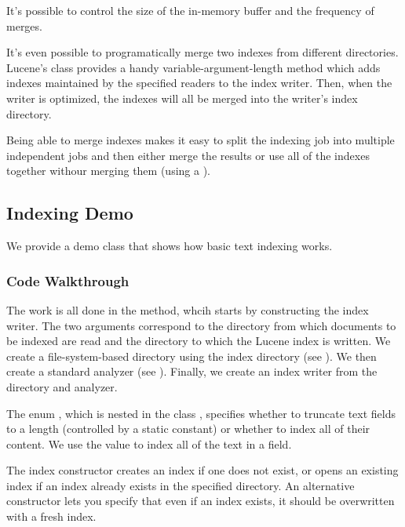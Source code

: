 It's possible to control the size of the in-memory buffer and the
frequency of merges.  

It's even possible to programatically merge two indexes from different
directories.  Lucene's  class provides a handy
variable-argument-length method 
which adds indexes maintained by the specified readers to the index
writer.  Then, when the writer is optimized, the indexes will all
be merged into the writer's index directory.  

Being able to merge indexes makes it easy to split the indexing job
into multiple independent jobs and then either merge the results or
use all of the indexes together withour merging them (using a
).


\subsection{Indexing Demo}

We provide a demo class  that shows how basic
text indexing works.  

\subsubsection{Code Walkthrough}

The work is all done in the  method, whcih starts by
constructing the index writer.
%
%
The two arguments correspond to the directory from which documents to
be indexed are read and the directory to which the Lucene index is
written.  We create a file-system-based directory using the index
directory (see ).  We then create a standard
analyzer (see ).  Finally, we create an index
writer from the directory and analyzer.  

The enum , which is nested in the class
, specifies whether to truncate text fields to a
length (controlled by a static constant) or whether to index all of
their content.  We use the value  to
index all of the text in a field.

The index constructor creates an index if one does not exist, or opens
an existing index if an index already exists in the specified
directory.  An alternative constructor lets you specify that even if
an index exists, it should be overwritten with a fresh index.

